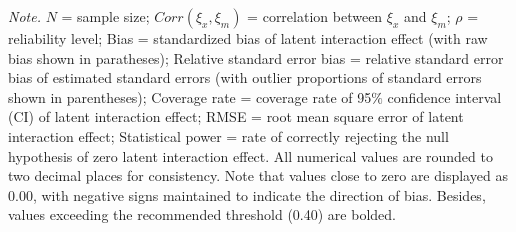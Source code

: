 \documentclass[
  man]{apa6}
\newenvironment{lltable}{\begin{landscape}\centering\begin{ThreePartTable}}{\end{ThreePartTable}\end{landscape}}
\begin{document}
\begin{lltable}

\begin{TableNotes}[para]
\normalsize{\textit{Note.} $\textit{N}$ = sample size; $Corr(\xi_{x}, \xi_{m})$ = correlation between $\xi_{x}$ and $\xi_{m}$; $\rho$ = reliability level; Bias = standardized bias of latent interaction effect (with raw bias shown in paratheses); Relative standard error bias = relative standard error bias of estimated standard errors (with outlier proportions of standard errors shown in parentheses); Coverage rate = coverage rate of 95$\%$ confidence interval (CI) of latent interaction effect; RMSE = root mean square error of latent interaction effect; Statistical power = rate of correctly rejecting the null hypothesis of zero latent interaction effect. All numerical values are rounded to two decimal places for consistency. Note that values close to zero are displayed as 0.00, with negative signs maintained to indicate the direction of bias. Besides, values exceeding the recommended threshold (0.40) are bolded.}
\end{TableNotes}

\tiny{

}
\end{lltable}
\end{document}

